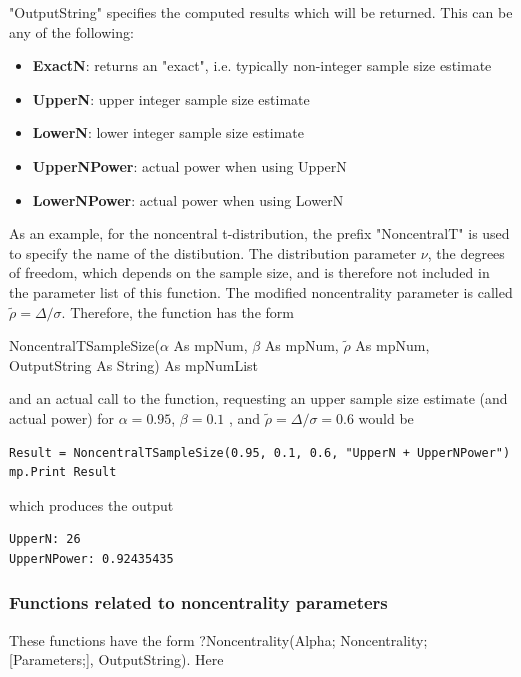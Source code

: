 "OutputString" specifies the computed results which will be returned. This can be any of the following:

\begin{itemize}
	\item \textbf{ExactN}: returns an "exact", i.e. typically non-integer sample size estimate 
	\item \textbf{UpperN}: upper integer sample size estimate
	\item \textbf{LowerN}: lower integer sample size estimate
	\item \textbf{UpperNPower}: actual power when using UpperN
	\item \textbf{LowerNPower}: actual power when using LowerN
\end{itemize}


\vspace{0.3cm}
As an example, for the noncentral  t-distribution, the prefix "NoncentralT" is used to specify the name of the distibution. The distribution parameter $\nu$, the degrees of freedom, which depends on the sample size, and is therefore not included in the parameter list of this function. The modified noncentrality parameter is called $\tilde{\rho} = \Delta/\sigma$. Therefore, the function has the form

\vspace{0.3cm}
\textsf{NoncentralTSampleSize($\alpha$ As mpNum, $\beta$ As mpNum, $\tilde{\rho}$ As mpNum, OutputString As String) As mpNumList}

\vspace{0.3cm}
and an actual call to the function, requesting an upper sample size estimate (and actual power) for $\alpha = 0.95$, $\beta=0.1$ , and $\tilde{\rho} = \Delta/\sigma = 0.6$   would be

\begin{lstlisting}
Result = NoncentralTSampleSize(0.95, 0.1, 0.6, "UpperN + UpperNPower")
mp.Print Result
\end{lstlisting}
which produces the output

\begin{verbatim}
UpperN: 26
UpperNPower: 0.92435435
\end{verbatim}



\newpage
\subsubsection{Functions related to noncentrality parameters}
\label{Functions related to noncentrality parameters}
These functions have the form \textsf{?Noncentrality(Alpha; Noncentrality; [Parameters;],  OutputString)}.
Here 


